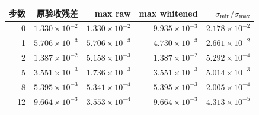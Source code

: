 \begin{tabular}{rrrrr}
\toprule
步数 & 原验收残差 & max raw & max whitened & $\sigma_{\min}/\sigma_{\max}$ \\
\midrule
0 & $1.330\times10^{-2}$ & $1.330\times10^{-2}$ & $9.935\times10^{-3}$ & $2.178\times10^{-2}$ \\
1 & $5.706\times10^{-3}$ & $5.706\times10^{-3}$ & $4.730\times10^{-3}$ & $2.661\times10^{-2}$ \\
2 & $1.387\times10^{-2}$ & $5.158\times10^{-3}$ & $1.387\times10^{-2}$ & $5.292\times10^{-4}$ \\
5 & $3.551\times10^{-3}$ & $1.736\times10^{-3}$ & $3.551\times10^{-3}$ & $5.014\times10^{-3}$ \\
8 & $5.395\times10^{-3}$ & $5.341\times10^{-4}$ & $5.395\times10^{-3}$ & $2.005\times10^{-4}$ \\
12 & $9.664\times10^{-3}$ & $3.553\times10^{-4}$ & $9.664\times10^{-3}$ & $4.313\times10^{-5}$ \\
\bottomrule
\end{tabular}
